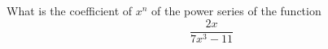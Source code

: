   What is the coefficient of $x^n$ of the power series of the function
  \[
    \frac{2x}{7x^3 - 11}
  \]
